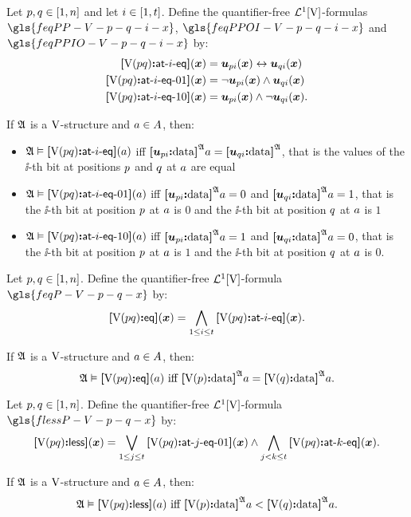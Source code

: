 \begin{definition}
Let $p, q \in [1, n]$ and let $i \in [1, t]$. Define the
quantifier-free $\mathcal{L}^{1}[\mathrm{V}]$-formulas $\gls{feqPP-V-p-q-i-x}$,
$\gls{feqPPOI-V-p-q-i-x}$ and $\gls{feqPPIO-V-p-q-i-x}$ by:
\begin{align*}
  {\bm{[}\mathrm{V}(pq)\mathord{\bm{:}} \mathsf{at}{\hbox{-}}i{\hbox{-}}\mathsf{eq} \bm{]}}(\bm{x}) &= \bm{u}_{pi}(\bm{x}) \leftrightarrow \bm{u}_{qi}(\bm{x}) \\
  {\bm{[}\mathrm{V}(pq)\mathord{\bm{:}} \mathsf{at}{\hbox{-}}i{\hbox{-}}\mathsf{eq}{\hbox{-}}01 \bm{]}}(\bm{x}) &= \lnot\bm{u}_{pi}(\bm{x}) \land \bm{u}_{qi}(\bm{x}) \\
  {\bm{[}\mathrm{V}(pq)\mathord{\bm{:}} \mathsf{at}{\hbox{-}}i{\hbox{-}}\mathsf{eq}{\hbox{-}}10 \bm{]}}(\bm{x}) &= \bm{u}_{pi}(\bm{x}) \land
  \lnot\bm{u}_{qi}(\bm{x}).
\end{align*}
\end{definition}
If $\mathfrak{A}$ is a $\mathrm{V}$-structure and $a \in A$, then:
\begin{itemize}
  \item $\mathfrak{A} \vDash {\bm{[}\mathrm{V}(pq)\mathord{\bm{:}} \mathsf{at}{\hbox{-}}i{\hbox{-}}\mathsf{eq} \bm{]}}(a)$ iff
  ${\bm{[}\bm{u}_{pi}\mathord{\bm{:}}\mathrm{data}\bm{]}}^{\mathfrak{A}}a = {\bm{[}\bm{u}_{qi}\mathord{\bm{:}}\mathrm{data}\bm{]}}^{\mathfrak{A}}$, that is
  the values of the $\ii$-th bit at positions $p$ and $q$ at $a$ are
  equal
  
  \item $\mathfrak{A} \vDash {\bm{[}\mathrm{V}(pq)\mathord{\bm{:}} \mathsf{at}{\hbox{-}}i{\hbox{-}}\mathsf{eq}{\hbox{-}}01 \bm{]}}(a)$ iff
  ${\bm{[}\bm{u}_{pi}\mathord{\bm{:}}\mathrm{data}\bm{]}}^{\mathfrak{A}}a = 0$ and ${\bm{[}\bm{u}_{qi}\mathord{\bm{:}}\mathrm{data}\bm{]}}^{\mathfrak{A}}a = 1$,
  that is the $\ii$-th bit at position $p$ at $a$ is $0$ and the $\ii$-th
  bit at position $q$ at $a$ is $1$
  
  \item $\mathfrak{A} \vDash {\bm{[}\mathrm{V}(pq)\mathord{\bm{:}} \mathsf{at}{\hbox{-}}i{\hbox{-}}\mathsf{eq}{\hbox{-}}10 \bm{]}}(a)$ iff
  ${\bm{[}\bm{u}_{pi}\mathord{\bm{:}}\mathrm{data}\bm{]}}^{\mathfrak{A}}a = 1$ and ${\bm{[}\bm{u}_{qi}\mathord{\bm{:}}\mathrm{data}\bm{]}}^{\mathfrak{A}}a = 0$,
  that is the $\ii$-th bit at position $p$ at $a$ is $1$ and the $\ii$-th
  bit at position $q$ at $a$ is $0$.
\end{itemize}

\begin{definition}
Let $p, q \in [1, n]$. Define the quantifier-free
$\mathcal{L}^{1}[\mathrm{V}]$-formula $\gls{feqP-V-p-q-x}$ by:
\[
  {\bm{[}\mathrm{V}(pq)\mathord{\bm{:}} \mathsf{eq}\bm{]}}(\bm{x}) = \bigwedge_{1 \leq i \leq t}
  {\bm{[}\mathrm{V}(pq)\mathord{\bm{:}} \mathsf{at}{\hbox{-}}i{\hbox{-}}\mathsf{eq} \bm{]}}(\bm{x}).
\]
\end{definition}
If $\mathfrak{A}$ is a $\mathrm{V}$-structure and $a \in A$,
then: 
\[
  \miff{
  \StrA \vDash \feqP\VS\posp\posq(\ea)}{
  \data{\VSp\posp}\StrA\ea = \data{\VSp\posq}\StrA\ea}.
\]

\begin{definition}
Let $p, q \in [1, n]$. Define the quantifier-free
$\mathcal{L}^{1}[\mathrm{V}]$-formula $\gls{flessP-V-p-q-x}$ by:
\[
  {\bm{[}\mathrm{V}(pq)\mathord{\bm{:}} \mathsf{less}\bm{]}}(\bm{x}) = \bigvee_{1 \leq j \leq t}
  {\bm{[}\mathrm{V}(pq)\mathord{\bm{:}} \mathsf{at}{\hbox{-}}j{\hbox{-}}\mathsf{eq}{\hbox{-}}01 \bm{]}}(\bm{x}) \land \bigwedge_{j < k \leq t}
  {\bm{[}\mathrm{V}(pq)\mathord{\bm{:}} \mathsf{at}{\hbox{-}}k{\hbox{-}}\mathsf{eq} \bm{]}}(\bm{x}).
\]
\end{definition}
If $\mathfrak{A}$ is a $\mathrm{V}$-structure and $a \in A$,
then:
\[
  \miff{
  \StrA \vDash \flessP\VS\posp\posq(\ea)}{
  \data{\VSp\posp}\StrA\ea < \data{\VSp\posq}\StrA\ea}.
\]

